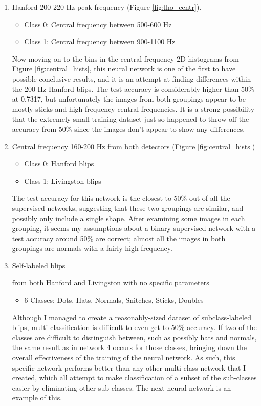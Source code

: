 \documentclass[a4paper]{article}
\begin{document}
\begin{enumerate}
	\item Hanford 200-220 Hz peak frequency (Figure \ref{fig:lho_centr}). 
	\begin{itemize}
		\item Class 0: Central frequency between 500-600 Hz
		\item Class 1: Central frequency between 900-1100 Hz
	\end{itemize} Now moving on to the bins in the central frequency 2D histograms from Figure \ref{fig:central_hists}, this neural network is one of the first to have possible conclusive results, and it is an attempt at finding differences within the 200 Hz Hanford blips. The test accuracy is considerably higher than 50\% at 0.7317, but unfortunately the images from both groupings appear to be mostly sticks and high-frequency central frequencies. It is a strong possibility that the extremely small training dataset just so happened to throw off the accuracy from 50\% since the images don't appear to show any differences. 
	
	\item Central frequency 160-200 Hz from both detectors (Figure \ref{fig:central_hists})
	\begin{itemize}
		\item Class 0: Hanford blips
		\item Class 1: Livingston blips
	\end{itemize} The test accuracy for this network is the closest to 50\% out of all the supervised networks, suggesting that these two groupings are similar, and possibly only include a single shape. After examining some images in each grouping, it seems my assumptions about a binary supervised network with a test accuracy around 50\% are correct; almost all the images in both groupings are normals with a fairly high frequency. 
	
	\item \hypertarget{multi}{Self-labeled blips} from both Hanford and Livingston with no specific parameters
	\begin{itemize}
		\item 6 Classes: Dots, Hats, Normals, Snitches, Sticks, Doubles
	\end{itemize} Although I managed to create a reasonably-sized dataset of subclass-labeled blips, multi-classification is difficult to even get to 50\% accuracy. If two of the classes are difficult to distinguish between, such as possibly hats and normals, the same result as in network \hyperlink{binary}{4} occurs for those classes, bringing down the overall effectiveness of the training of the neural network. As such, this specific network performs better than any other multi-class network that I created, which all attempt to make classification of a subset of the sub-classes easier by eliminating other sub-classes. The next neural network is an example of this.
	

\end{enumerate}
\end{document}
